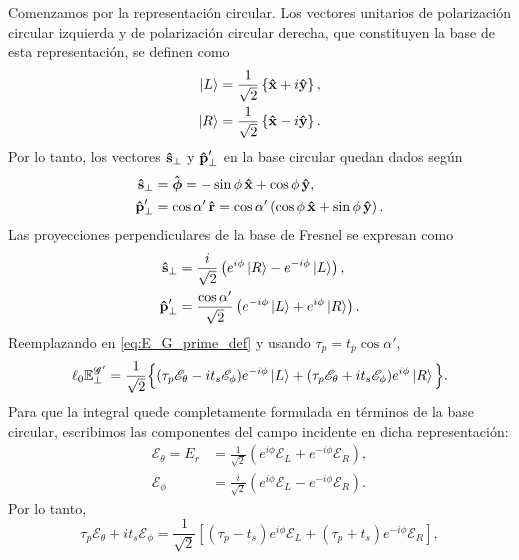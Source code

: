 Comenzamos por la representación circular. Los vectores unitarios de polarización circular izquierda y de polarización circular derecha, que constituyen la base de esta representación, se definen como
\begin{equation}
\begin{aligned}
  \ket L
  &=
  \frac{1}{\sqrt 2}
  \left\{
  \bm{\hat{\mathbf{x}}} + i \bm{\hat{\mathbf{y}}}
  \right\},
  \\
  \ket R
  &=
  \frac{1}{\sqrt 2}
  \left\{
  \bm{\hat{\mathbf{x}}} - i \bm{\hat{\mathbf{y}}}
  \right\}.
  \label{eq:def_of_circular_basis}
\end{aligned}
\end{equation}
Por lo tanto, los vectores $\bm{\hat{\mathbf{s}}}_\perp$ y $\bm{\hat{\mathbf{p}}}'_\perp$ en la base circular quedan dados según
\begin{align}
\bm{\hat{\mathbf{s}}}_\perp
&=
\bm{\hat{\mathbf{\phi}}}
=
-\sin\phi\,\bm{\hat{\mathbf{x}}}
+
\cos\phi\,\bm{\hat{\mathbf{y}}},
\\
\bm{\hat{\mathbf{p}}}'_\perp
&=
\cos\alpha'\,\bm{\hat{\mathbf{r}}}
=
\cos\alpha'
\left(
\cos\phi\,\bm{\hat{\mathbf{x}}}
+
\sin\phi\,\bm{\hat{\mathbf{y}}}
\right).
\end{align}
Las proyecciones perpendiculares de la base de Fresnel se expresan como
\begin{align}
\bm{\hat{\mathbf{s}}}_\perp
&=
\frac{i}{\sqrt{2}}
\left(
e^{i\phi}\ket{R}
-
e^{-i\phi}\ket{L}
\right),
\\
\bm{\hat{\mathbf{p}}}'_\perp
&=
\frac{\cos\alpha'}{\sqrt{2}}
\left(
e^{-i\phi}\ket{L}
+
e^{i\phi}\ket{R}
\right).
\end{align}
Reemplazando en \eqref{eq:E_G_prime_def} y usando $\tau_p=t_p\cos\alpha'$,
\begin{equation}
  \ell_0 \mathbb{E}^{\mathscr G'}_\perp
=
\frac{1}{\sqrt{2}}
\Big\{
(\tau_p \mathscr E_\theta - i t_s \mathscr E_\phi)e^{-i\phi}\ket{L}
+
(\tau_p \mathscr E_\theta + i t_s \mathscr E_\phi)e^{i\phi}\ket{R}
\Big\}.
\end{equation}
Para que la integral quede completamente formulada en términos de la base circular, escribimos las componentes del campo incidente en dicha representación:
\begin{align}
\mathscr E_\theta
=
E_r
&=
\frac{1}{\sqrt{2}}
\left(
e^{i\phi}\mathscr E_L
+
e^{-i\phi}\mathscr E_R
\right),
\label{eq:Ep_in_LR_basis}
\\
\mathscr E_\phi
&=
\frac{i}{\sqrt{2}}
\left(
e^{i\phi}\mathscr E_L
-
e^{-i\phi}\mathscr E_R
\right).
\label{eq:Ephi_in_LR_basis}
\end{align}
Por lo tanto,
\begin{equation}
\tau_p\mathscr E_\theta+i t_s\mathscr E_\phi
=
\frac{1}{\sqrt2}
\left[
(\tau_p-t_s)e^{i\phi}\mathscr E_L
+
(\tau_p+t_s)e^{-i\phi}\mathscr E_R
\right],
\end{equation}

